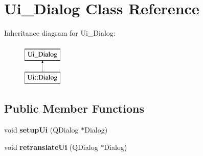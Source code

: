 \hypertarget{class_ui___dialog}{}\section{Ui\+\_\+\+Dialog Class Reference}
\label{class_ui___dialog}
Inheritance diagram for Ui\+\_\+\+Dialog\+:\begin{figure}[H]
\begin{center}
\leavevmode
\includegraphics[height=2.000000cm]{class_ui___dialog}
\end{center}
\end{figure}
\subsection*{Public Member Functions}
\begin{DoxyCompactItemize}
\item 
\hypertarget{class_ui___dialog_a4f6a478c3ecdafabffb17b39cb26444a}{}void {\bfseries setup\+Ui} (Q\+Dialog $\ast$Dialog)\label{class_ui___dialog_a4f6a478c3ecdafabffb17b39cb26444a}

\item 
\hypertarget{class_ui___dialog_afa0ccb6f716ca6178260522a193c250e}{}void {\bfseries retranslate\+Ui} (Q\+Dialog $\ast$Dialog)\label{class_ui___dialog_afa0ccb6f716ca6178260522a193c250e}

\end{DoxyCompactItemize}

